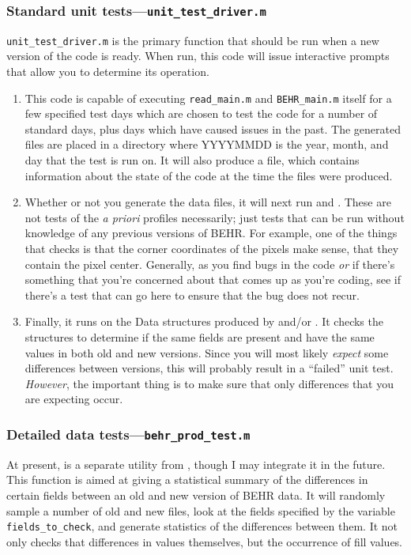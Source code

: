 \documentclass[12pt]{article}
\begin{document}
	\subsubsection{Standard unit tests---\lstinline$unit_test_driver.m$}
	\lstinline$unit_test_driver.m$ is the primary function that should be run when a new version of the code is ready.  When run, this code will issue interactive prompts that allow you to determine its operation.
	\begin{enumerate}
	\item This code is capable of executing \lstinline$read_main.m$ and \lstinline$BEHR_main.m$ itself for a few specified test days which are chosen to test the code for a number of standard days, plus days which have caused issues in the past.  The generated files are placed in a directory  where YYYYMMDD is the year, month, and day that the test is run on. It will also produce a file,  which contains information about the state of the code at the time the files were produced.
	
	\item Whether or not you generate the data files, it will next run  and . These are not tests of the \emph{a priori} profiles necessarily; just tests that can be run without knowledge of any previous versions of BEHR. For example, one of the things that  checks is that the corner coordinates of the pixels make sense, that they contain the pixel center. Generally, as you find bugs in the code \emph{or} if there's something that you're concerned about that comes up as you're coding, see if there's a test that can go here to ensure that the bug does not recur.
	
	\item Finally, it runs  on the Data structures produced by  and/or . It checks the structures to determine if the same fields are present and have the same values in both old and new versions. Since you will most likely \emph{expect} some differences between versions, this will probably result in a ``failed'' unit test. \emph{However}, the important thing is to make sure that only differences that you are expecting occur.
	\end{enumerate}
	
	\subsubsection{Detailed data tests---\lstinline$behr_prod_test.m$}
	At present,  is a separate utility from , though I may integrate it in the future.  This function is aimed at giving a statistical summary of the differences in certain fields between an old and new version of BEHR data. It will randomly sample a number of old and new files, look at the fields specified by the variable \lstinline$fields_to_check$, and generate statistics of the differences between them. It not only checks that differences in values themselves, but the occurrence of fill values.
	
\end{document}
